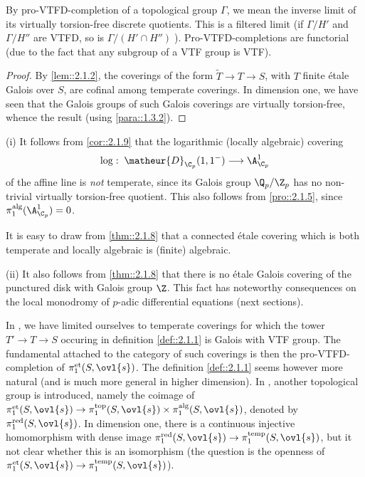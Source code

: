 By pro-VTFD-completion of a topological group $\Gamma$, we mean the
inverse limit of its virtually torsion-free discrete quotients. This is
a filtered limit (if $\Gamma/H'$ and $\Gamma/H''$ are VTFD, so is
$\Gamma/(H'\cap H'')\;$). Pro-VTFD-completions are functorial (due to
the fact that any subgroup of a VTF group is VTF).

\begin{proof}
 By \ref{lem::2.1.2}, the coverings of the form $\tilde T\to T \to S$, with $T$
 finite \'etale Galois over $S$, are cofinal among temperate
 coverings. In dimension one, we have seen that the Galois groups of such
 Galois coverings are virtually torsion-free, whence the result (using
 \ref{para::1.3.2}).
\end{proof}

\medskip{} (i) It follows from \ref{cor::2.1.9}
that the logarithmic (locally algebraic) covering
\begin{equation*}
\log:\; \matheur{D}_{\C_p}(1,1^-)\longrightarrow  \A^1_{\C_p} 
\end{equation*}
of the affine line is {\it not }temperate, since its Galois group
$\Q_p/\Z_p$ has no non-trivial virtually torsion-free 
quotient. This also follows from \ref{pro::2.1.5}, since
$\pi_1^{\mathrm{alg}}(\A^1_{\C_p})=0$. 

\medskip{} It is easy to draw from \ref{thm::2.1.8} that a
connected \'etale covering which is both temperate 
and locally algebraic is (finite) algebraic.

\medskip \noindent (ii) It also follows from \ref{thm::2.1.8} that there is no
\'etale Galois covering of the punctured disk with Galois group
$\Z$. This fact has noteworthy consequences on the local monodromy of
$p$-adic differential equations (\cf next sections).

{\small
\medskip{} In \cite{poaptg}, we have limited
ourselves to temperate coverings for which the tower $T'\to T\to S$ 
occuring in definition \ref{def::2.1.1} is Galois with VTF group. The
fundamental attached to the category of such coverings is 
then the pro-VTFD-completion of $\pi_1^{\mathrm{et}}(S,\ovl{s})$. The
definition \ref{def::2.1.1} seems however more natural (and is much more 
general in higher dimension). In \cite{poaptg}, another topological
group is introduced, namely the coimage of 
$\pi_1^{\mathrm{et}}(S,\ovl{s})\to \pi_1^{\mathrm{top}}(S,\ovl{s})\times
\pi_1^{\mathrm{alg}}(S,\ovl{s})$, denoted by
$\pi_1^{\mathrm{red}}(S,\ovl{s})$. In dimension one, there is a continuous
injective homomorphism with dense image $\pi_1^{\mathrm{red}}(S,\ovl{s})\to
\pi_1^{\mathrm{temp}}(S,\ovl{s})$, but it not clear whether this is an
isomorphism (the question is the openness of 
$\pi_1^{\mathrm{et}}(S,\ovl{s})\to 
\pi_1^{\mathrm{temp}}(S,\ovl{s})$).
}

